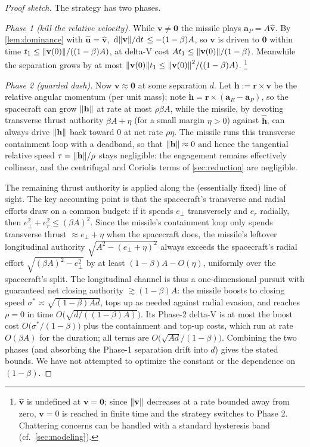 \documentclass{article}
\newcommand{\eqdef}{:=}
\renewcommand{\vec}[1]{\mathbf{#1}}
\theoremstyle{remark}
\begin{document}
\begin{proof}[Proof sketch]
  The strategy has two phases.

  \emph{Phase 1 (kill the relative velocity).}  While $\vec v \ne \vec 0$ the
  missile plays $\vec a_P = A \hat{\vec v}$.  By \cref{lem:dominance} with
  $\hat{\vec u} = \hat{\vec v}$,
  $\dv*{\norm{\vec v}}{t} \le -(1-\beta)A$, so $\vec v$ is driven to $\vec 0$
  within time $t_1 \le \norm{\vec v(0)} / ((1-\beta)A)$, at delta-V cost
  $A t_1 \le \norm{\vec v(0)}/(1-\beta)$.  Meanwhile the separation grows by at
  most $\norm{\vec v(0)} t_1 \le \norm{\vec v(0)}^2/((1-\beta)A)$.%
  \footnote{$\hat{\vec v}$ is undefined at $\vec v = \vec 0$; since
    $\norm{\vec v}$ decreases at a rate bounded away from zero, $\vec v = 0$ is
    reached in finite time and the strategy switches to Phase 2.  Chattering
    concerns can be handled with a standard hysteresis band
    (cf.\ \cref{sec:modeling}).}

  \emph{Phase 2 (guarded dash).}  Now $\vec v \approx \vec 0$ at some
  separation $d$.  Let $\vec h \eqdef \vec r \times \vec v$ be the relative
  angular momentum (per unit mass); note $\dot{\vec h} = \vec r \times
  (\vec a_E - \vec a_P)$, so the spacecraft can grow $\norm{\vec h}$ at rate at
  most $\rho \beta A$, while the missile, by devoting transverse thrust
  authority $\beta A + \eta$ (for a small margin $\eta > 0$) against
  $\hat{\vec h}$, can always drive $\norm{\vec h}$ back toward $0$ at net rate
  $\rho\eta$.  The missile runs this transverse containment loop with a
  deadband, so that $\norm{\vec h} \approx 0$ and hence the tangential relative
  speed $\tau = \norm{\vec h}/\rho$ stays negligible: the engagement remains
  effectively collinear, and the centrifugal and Coriolis terms of
  \cref{sec:reduction} are negligible.

  The remaining thrust authority is applied along the (essentially fixed) line
  of sight.  The key accounting point is that the spacecraft's transverse and
  radial efforts draw on a common budget: if it spends $e_\perp$ transversely
  and $e_r$ radially, then $e_\perp^2 + e_r^2 \le (\beta A)^2$.  Since the
  missile's containment loop only spends transverse thrust
  $\approx e_\perp + \eta$ when the spacecraft does, the missile's leftover
  longitudinal authority $\sqrt{A^2 - (e_\perp + \eta)^2}$ always exceeds the
  spacecraft's radial effort $\sqrt{(\beta A)^2 - e_\perp^2}$ by at least
  $(1-\beta)A - O(\eta)$, uniformly over the spacecraft's split.  The
  longitudinal channel is thus a one-dimensional pursuit with guaranteed net
  closing authority $\gtrsim (1-\beta)A$: the missile boosts to closing speed
  $\sigma^* \asymp \sqrt{(1-\beta) A d}$, tops up as needed against radial
  evasion, and reaches $\rho = 0$ in time $O\big(\sqrt{d/((1-\beta)A)}\big)$.
  Its Phase-2 delta-V is at most the boost cost
  $O\big(\sigma^*/(1-\beta)\big)$ plus the containment and top-up costs, which
  run at rate $O(\beta A)$ for the duration; all terms are
  $O\big(\sqrt{Ad}/(1-\beta)\big)$.  Combining the two phases (and absorbing
  the Phase-1 separation drift into $d$) gives the stated bounds.  We have not
  attempted to optimize the constant or the dependence on $(1-\beta)$.
\end{proof}
\end{document}
